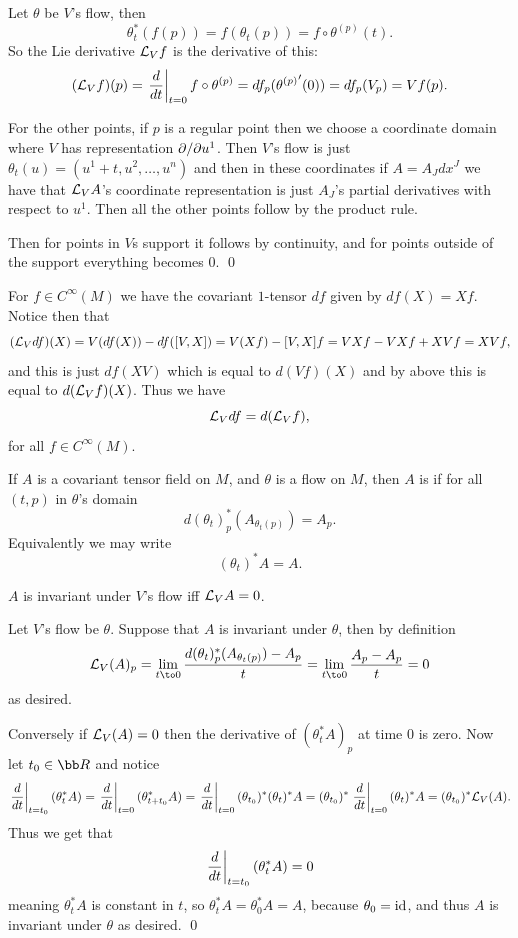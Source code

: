 \eprop

\bproof

    Let $\theta$ be $V$'s flow, then
    $$ \theta_t^*(f(p)) = f(\theta_t(p)) = f\circ\theta^{(p)}(t) . $$
    So the Lie derivative ${{\cal L}}_Vf$ is the derivative of this:
    $$ ({{\cal L}}_Vf)(p) = \left.{{d}\over{dt}}\right|_{t=0}f\circ\theta^{(p)} = df_p({\theta^{(p)}}'(0)) = df_p(V_p) = Vf(p) . $$

    For the other points, if $p$ is a regular point then we choose a coordinate domain where $V$ has representation $\partial /\partial u^1$.
    Then $V$'s flow is just $\theta_t(u)=(u^1+t,u^2,\dots,u^n)$ and then in these coordinates if $A=A_Jdx^J$ we have that ${{\cal L}}_VA$'s coordinate
    representation is just $A_J$'s partial derivatives with respect to $u^1$.
    Then all the other points follow by the product rule.

    Then for points in $V$s support it follows by continuity, and for points outside of the support everything becomes $0$.
    \qed

\eproof

For $f\in C^\infty(M)$ we have the covariant $1$-tensor $df$ given by $df(X)=Xf$.
Notice then that
$$ ({{\cal L}}_Vdf)(X) = V(df(X)) - df([V,X]) = V(Xf) - [V,X]f = VXf - VXf + XVf = XVf , $$
and this is just $df(XV)$ which is equal to $d(Vf)(X)$ and by above this is equal to $d({{\cal L}}_Vf)(X)$.
Thus we have
$$ {{\cal L}}_Vdf = d({{\cal L}}_Vf) , $$
for all $f\in C^\infty(M)$.

\bdefn

    If $A$ is a covariant tensor field on $M$, and $\theta$ is a flow on $M$, then $A$ is  if for all
    $(t,p)$ in $\theta$'s domain
    $$ d(\theta_t)^*_p(A_{\theta_t(p)}) = A_p . $$
    Equivalently we may write
    $$ (\theta_t)^*A = A . $$

\edefn

\bthrm

    $A$ is invariant under $V$'s flow iff ${{\cal L}}_VA=0$.

\ethrm

\bproof

    Let $V$'s flow be $\theta$.
    Suppose that $A$ is invariant under $\theta$, then by definition
    $$ \L_V(A)_p = \lim_{t\to0}\frac{d(\theta_t)^*_p(A_{\theta_t(p)}) - A_p}t = \lim_{t\to0}\frac{A_p-A_p}t = 0 $$
    as desired.

    Conversely if ${{\cal L}}_V(A)=0$ then the derivative of $(\theta_t^*A)_p$ at time $0$ is zero.
    Now let $t_0\in\bR$ and notice
    $$ \left.{{d}\over{dt}}\right|_{t=t_0}(\theta_t^*A) = \left.{{d}\over{dt}}\right|_{t=0}(\theta_{t+t_0}^*A) = \left.{{d}\over{dt}}\right|_{t=0}(\theta_{t_0})^*(\theta_t)^*A
    = (\theta_{t_0})^*\left.{{d}\over{dt}}\right|_{t=0}(\theta_t)^*A = (\theta_{t_0})^*{{\cal L}}_V(A) . $$
    Thus we get that
    $$ \left.{{d}\over{dt}}\right|_{t=t_0}(\theta_t^*A) = 0 $$
    meaning $\theta_t^*A$ is constant in $t$, so $\theta_t^*A=\theta_0^*A=A$, because $\theta_0={\rm id}$, and thus $A$ is
    invariant under $\theta$ as desired.
    \qed

